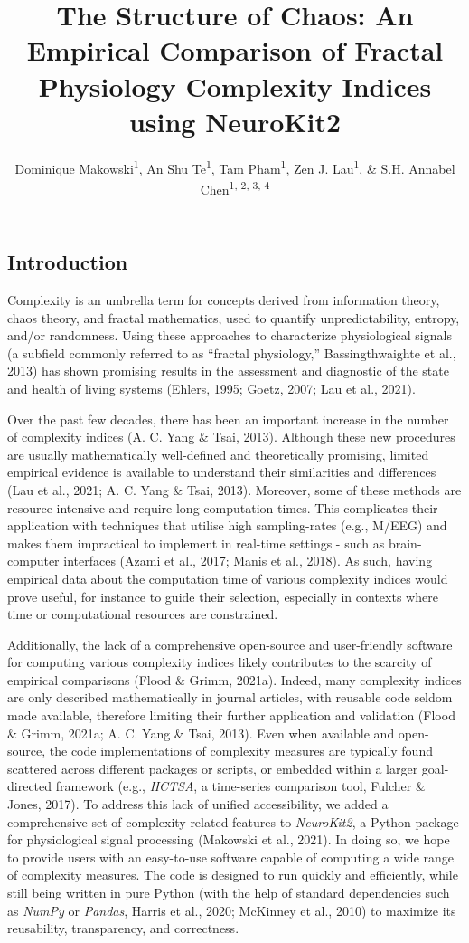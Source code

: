 \documentclass[
  man]{apa6}
\title{\textbf{The Structure of Chaos: An Empirical Comparison of Fractal Physiology Complexity Indices using NeuroKit2}}
\author{Dominique Makowski\textsuperscript{1}, An Shu Te\textsuperscript{1}, Tam Pham\textsuperscript{1}, Zen J. Lau\textsuperscript{1}, \& S.H. Annabel Chen\textsuperscript{1, 2, 3, 4}}
\date{}
\affiliation{\vspace{0.5cm}\textsuperscript{1} School of Social Sciences, Nanyang Technological University, Singapore\\\textsuperscript{2} LKC Medicine, Nanyang Technological University, Singapore\\\textsuperscript{3} National Institute of Education, Singapore\\\textsuperscript{4} Centre for Research and Development in Learning, Nanyang Technological University, Singapore}
\begin{document}
\maketitle

\hypertarget{introduction}{%
\subsection{Introduction}\label{introduction}}

Complexity is an umbrella term for concepts derived from information theory, chaos theory, and fractal mathematics, used to quantify unpredictability, entropy, and/or randomness. Using these approaches to characterize physiological signals (a subfield commonly referred to as ``fractal physiology,'' Bassingthwaighte et al., 2013) has shown promising results in the assessment and diagnostic of the state and health of living systems (Ehlers, 1995; Goetz, 2007; Lau et al., 2021).

Over the past few decades, there has been an important increase in the number of complexity indices (A. C. Yang \& Tsai, 2013). Although these new procedures are usually mathematically well-defined and theoretically promising, limited empirical evidence is available to understand their similarities and differences (Lau et al., 2021; A. C. Yang \& Tsai, 2013). Moreover, some of these methods are resource-intensive and require long computation times. This complicates their application with techniques that utilise high sampling-rates (e.g., M/EEG) and makes them impractical to implement in real-time settings - such as brain-computer interfaces (Azami et al., 2017; Manis et al., 2018). As such, having empirical data about the computation time of various complexity indices would prove useful, for instance to guide their selection, especially in contexts where time or computational resources are constrained.

Additionally, the lack of a comprehensive open-source and user-friendly software for computing various complexity indices likely contributes to the scarcity of empirical comparisons (Flood \& Grimm, 2021a). Indeed, many complexity indices are only described mathematically in journal articles, with reusable code seldom made available, therefore limiting their further application and validation (Flood \& Grimm, 2021a; A. C. Yang \& Tsai, 2013). Even when available and open-source, the code implementations of complexity measures are typically found scattered across different packages or scripts, or embedded within a larger goal-directed framework (e.g., \emph{HCTSA}, a time-series comparison tool, Fulcher \& Jones, 2017). To address this lack of unified accessibility, we added a comprehensive set of complexity-related features to \emph{NeuroKit2}, a Python package for physiological signal processing (Makowski et al., 2021). In doing so, we hope to provide users with an easy-to-use software capable of computing a wide range of complexity measures. The code is designed to run quickly and efficiently, while still being written in pure Python (with the help of standard dependencies such as \emph{NumPy} or \emph{Pandas}, Harris et al., 2020; McKinney et al., 2010) to maximize its reusability, transparency, and correctness.
\end{document}
